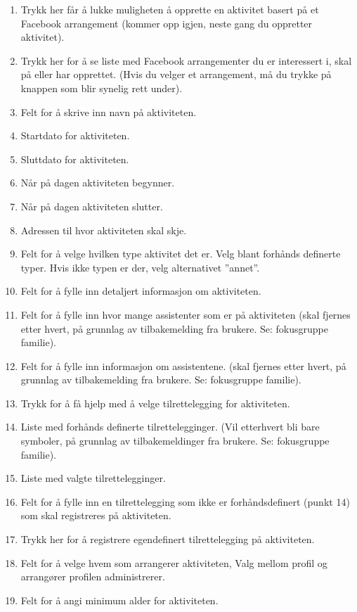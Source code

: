 \begin{enumerate}[nosep]
    \item Trykk her får å lukke muligheten å opprette en aktivitet basert på et Facebook arrangement (kommer opp igjen, neste gang du oppretter aktivitet).
    \item Trykk her for å se liste med Facebook arrangementer du er interessert i, skal på eller har opprettet. (Hvis du velger et arrangement, må du trykke på knappen som blir synelig  rett under).
    \item Felt for å skrive inn navn på aktiviteten.
    \item Startdato for aktiviteten.
    \item Sluttdato for aktiviteten.
    \item Når på dagen aktiviteten begynner.
    \item Når på dagen aktiviteten slutter.
    \item Adressen til hvor aktiviteten skal skje.
    \item Felt for å velge hvilken type aktivitet det er. Velg blant forhånds definerte typer. Hvis ikke typen er der, velg alternativet ”annet”.
    \item Felt for å fylle inn detaljert informasjon om aktiviteten.
    \item Felt for å fylle inn hvor mange assistenter som er på aktiviteten (skal fjernes etter hvert, på grunnlag av tilbakemelding fra brukere. Se: fokusgruppe familie).
    \item Felt for å fylle inn informasjon om assistentene. (skal fjernes etter hvert, på grunnlag av tilbakemelding fra brukere. Se: fokusgruppe familie).
    \item Trykk for å få hjelp med å velge tilrettelegging for aktiviteten.
    \item Liste med forhånds definerte tilrettelegginger. (Vil etterhvert bli bare symboler, på grunnlag av tilbakemeldinger fra brukere. Se: fokusgruppe familie).
    \item Liste med valgte tilrettelegginger.
    \item Felt for å fylle inn en tilrettelegging som ikke er forhåndsdefinert (punkt 14) som skal registreres på aktiviteten.
    \item Trykk her for å registrere egendefinert tilrettelegging på aktiviteten.
    \item Felt for å velge hvem som arrangerer aktiviteten, Valg mellom profil og arrangører profilen administrerer.
    \item Felt for å angi minimum alder for aktiviteten.

\end{enumerate}

